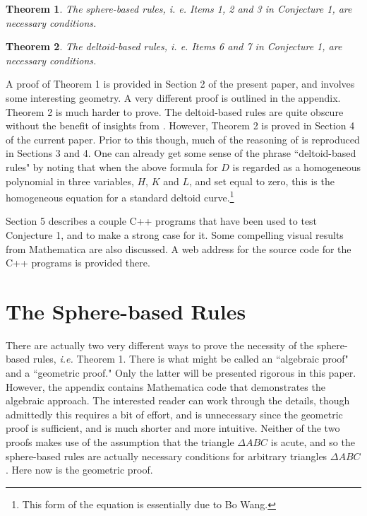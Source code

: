 \documentclass[a4paper, twoside]{article}
\newtheorem{theorem}{Theorem}
\begin{document}
\vspace{2mm}

\begin{theorem}
The sphere-based rules, {\it i. e.} Items 1, 2 and 3 in Conjecture 1, are necessary conditions.
\end{theorem} 

\vspace{2mm}

\begin{theorem}
The deltoid-based rules, {\it i. e.} Items 6 and 7 in Conjecture 1, are necessary conditions.
\end{theorem} 

\vspace{2mm}

A proof of Theorem 1 is provided in Section 2 of the present paper, and involves some interesting geometry. A very different proof is outlined in the appendix. Theorem 2 is much harder to prove. The deltoid-based rules are quite obscure without the benefit of insights from \cite{RW}. However, Theorem 2 is proved in Section 4 of the current paper. Prior to this though, much of the reasoning of \cite{RW} is reproduced in Sections 3 and 4. One can already get some sense of the phrase ``deltoid-based rules" by noting that when the above formula for $D$ is regarded as a homogeneous polynomial in three variables, $H$, $K$ and $L$, and set equal to zero, this is the homogeneous equation for a standard deltoid curve.\footnote{This form of the equation is essentially due to Bo Wang.}

Section 5 describes a couple C++ programs that have been used to test Conjecture 1, and to make a strong case for it. Some compelling visual results from Mathematica are also discussed. A web address for the source code for the C++ programs is provided there.   


\section{The Sphere-based Rules}

There are actually two very different ways to prove the necessity of the sphere-based rules, {\it i.e.} Theorem 1. There is what might be called an ``algebraic proof" and a ``geometric proof." Only the latter will be presented rigorous in this paper. However, the appendix contains Mathematica code that demonstrates the algebraic approach. The interested reader can work through the details, though admittedly this requires a bit of effort, and is unnecessary since the geometric proof is sufficient, and is much shorter and more intuitive. Neither of the two proofs makes use of the assumption that the triangle $\Delta ABC$ is acute, and so the sphere-based rules are actually necessary conditions for arbitrary triangles $\Delta ABC$. Here now is the geometric proof. 
\end{document}
